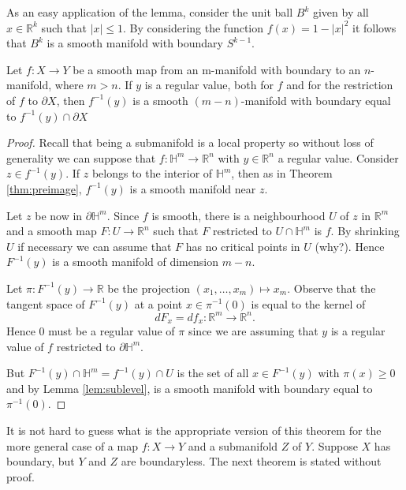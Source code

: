 \documentclass[a4paper]{scrartcl}
\begin{document}
As an easy application of the lemma, consider the unit ball $B^{k}$ given by all $x \in \mathbb{R}^{k}$ such that $|x| \leq 1$. By considering the function $f(x)=1-|x|^{2}$ it follows that $B^{k}$ is a smooth manifold with boundary $S^{k-1}$.

\begin{theorem}
    Let $f: X \rightarrow Y$ be a smooth map from an m-manifold with boundary to an $n$-manifold, where $m>n$. If $y$ is a regular value, both for $f$ and for the restriction of $f$ to $\partial X$, then $f^{-1}(y)$ is a smooth $(m-n)$-manifold with boundary equal to $f^{-1}(y) \cap \partial X$
\end{theorem}
\begin{proof}
    Recall that being a submanifold is a local property so without loss of generality we can suppose that $f: \mathbb{H}^{m} \rightarrow \mathbb{R}^{n}$ with $y \in \mathbb{R}^{n}$ a regular value. Consider $z \in f^{-1}(y)$. If $z$ belongs to the interior of $\mathbb{H}^{m}$, then as in Theorem \ref{thm:preimage}, $f^{-1}(y)$ is a smooth manifold near $z$.

Let $z$ be now in $\partial \mathbb{H}^{m}$. Since $f$ is smooth, there is a neighbourhood $U$ of $z$ in $\mathbb{R}^{m}$ and a smooth map $F: U \rightarrow \mathbb{R}^{n}$ such that $F$ restricted to $U \cap \mathbb{H}^{m}$ is $f$. By shrinking $U$ if necessary we can assume that $F$ has no critical points in $U$ (why?). Hence $F^{-1}(y)$ is a smooth manifold of dimension $m-n$.

Let $\pi: F^{-1}(y) \rightarrow \mathbb{R}$ be the projection $\left(x_{1}, \ldots, x_{m}\right) \mapsto x_{m}$. Observe that the tangent space of $F^{-1}(y)$ at a point $x \in \pi^{-1}(0)$ is equal to the kernel of
$$
d F_{x}=d f_{x}: \mathbb{R}^{m} \rightarrow \mathbb{R}^{n}.
$$
Hence 0 must be a regular value of $\pi$ since we are assuming that $y$ is a regular value of $f$ restricted to $\partial \mathbb{H}^{m}$.

But $F^{-1}(y) \cap \mathbb{H}^{m}=f^{-1}(y) \cap U$ is the set of all $x \in F^{-1}(y)$ with $\pi(x) \geq 0$ and by Lemma \ref{lem:sublevel}, is a smooth manifold with boundary equal to $\pi^{-1}(0)$.
\end{proof}

It is not hard to guess what is the appropriate version of this theorem for the more general case of a map $f: X \rightarrow Y$ and a submanifold $Z$ of $Y$. Suppose $X$ has boundary, but $Y$ and $Z$ are boundaryless. The next theorem is stated without proof.
\end{document}
